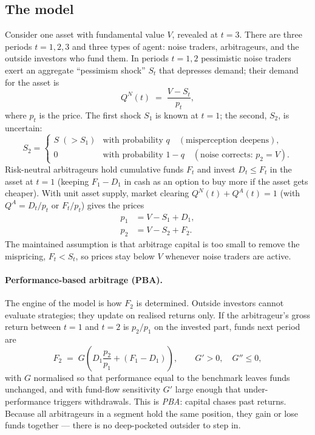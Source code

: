 \subsection*{The model}
Consider one asset with fundamental value $V$, revealed at $t=3$. There are three periods $t=1,2,3$ and three types of agent: noise traders, arbitrageurs, and the outside investors who fund them. In periods $t=1,2$ pessimistic noise traders exert an aggregate ``pessimism shock'' $S_t$ that depresses demand; their demand for the asset is
\begin{equation}
Q^{N}(t) \;=\; \frac{V - S_t}{p_t},
\end{equation}
where $p_t$ is the price. The first shock $S_1$ is known at $t=1$; the second, $S_2$, is uncertain:
\begin{equation}
S_2 = \begin{cases} S \;(>S_1) & \text{with probability } q \quad(\text{misperception deepens}),\\[2pt] 0 & \text{with probability } 1-q \quad(\text{noise corrects: } p_2=V).\end{cases}
\end{equation}
Risk-neutral arbitrageurs hold cumulative funds $F_t$ and invest $D_t \le F_t$ in the asset at $t=1$ (keeping $F_1-D_1$ in cash as an option to buy more if the asset gets cheaper). With unit asset supply, market clearing $Q^N(t)+Q^A(t)=1$ (with $Q^A=D_t/p_t$ or $F_t/p_t$) gives the prices
\begin{align}
p_1 &= V - S_1 + D_1, \label{eq:sv-p1}\\
p_2 &= V - S_2 + F_2. \label{eq:sv-p2}
\end{align}
The maintained assumption is that arbitrage capital is too small to remove the mispricing, $F_t < S_t$, so prices stay below $V$ whenever noise traders are active.

\paragraph{Performance-based arbitrage (PBA).} The engine of the model is how $F_2$ is determined. Outside investors cannot evaluate strategies; they update on realised returns only. If the arbitrageur's gross return between $t=1$ and $t=2$ is $p_2/p_1$ on the invested part, funds next period are
\begin{equation}
F_2 \;=\; G\!\left(D_1\frac{p_2}{p_1} + (F_1 - D_1)\right), \qquad G'>0,\quad G''\le 0, \label{eq:sv-G}
\end{equation}
with $G$ normalised so that performance equal to the benchmark leaves funds unchanged, and with fund-flow sensitivity $G'$ large enough that under-performance triggers withdrawals. This is \emph{PBA}: capital chases past returns. Because all arbitrageurs in a segment hold the same position, they gain or lose funds together --- there is no deep-pocketed outsider to step in.

